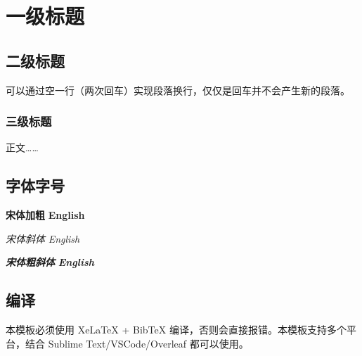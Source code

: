 %
%
%
%
%


\chapter{一级标题}

\section{二级标题}
可以通过空一行（两次回车）实现段落换行，仅仅是回车并不会产生新的段落\cite{yuFeiJiZongTiDuoXueKeSheJiYouHuaDeXianZhuangYuFaZhanFangXiang2008}。

\subsection{三级标题}

正文……\cite{simonyanVeryDeepConvolutional2015}

\section{字体字号}

{\songti \bfseries 宋体加粗} {\textbf{English}}

{\songti \itshape 宋体斜体} {\textit{English}}

{\songti \bfseries \itshape 宋体粗斜体} {\textbf{\textit{English}}}

\section{编译}

本模板必须使用 XeLaTeX + BibTeX 编译，否则会直接报错。本模板支持多个平台，结合 Sublime Text/VSCode/Overleaf 都可以使用。


